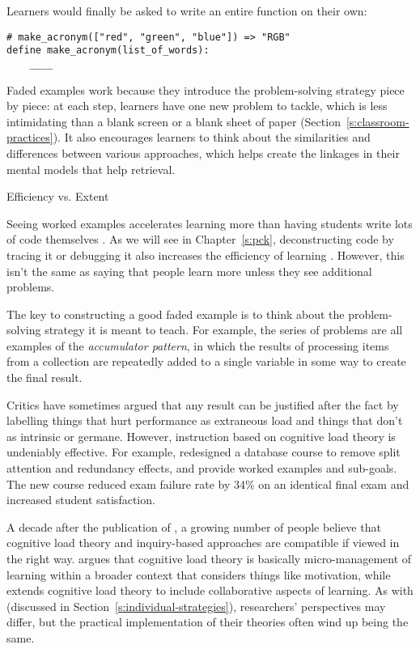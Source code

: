 Learners would finally be asked to write an entire function on their
own:

\begin{verbatim}
# make_acronym(["red", "green", "blue"]) => "RGB"
define make_acronym(list_of_words):
    ____
\end{verbatim}

Faded examples work because they introduce the problem-solving strategy
piece by piece: at each step, learners have one new problem to tackle,
which is less intimidating than a blank screen or a blank sheet of paper
(Section~\ref{s:classroom-practices}). It also encourages learners to
think about the similarities and differences between various approaches,
which helps create the linkages in their mental models that help
retrieval.

\begin{aside}{Efficiency vs. Extent}

Seeing worked examples accelerates learning more than having students
write lots of code themselves \cite{Skud2014}. As we will see in
Chapter~\ref{s:pck}, deconstructing code by tracing it or debugging it
also increases the efficiency of learning \cite{Grif2016}. However,
this isn't the same as saying that people learn more unless they see
additional problems.

\end{aside}

The key to constructing a good faded example is to think about the
problem-solving strategy it is meant to teach. For example, the series
of problems are all examples of the \emph{accumulator pattern}, in which the
results of processing items from a collection are repeatedly added to a
single variable in some way to create the final result.

Critics have sometimes argued that any result can be justified after the
fact by labelling things that hurt performance as extraneous load and
things that don't as intrinsic or germane. However, instruction based on
cognitive load theory is undeniably effective. For example,
\cite{Maso2016} redesigned a database course to remove split
attention and redundancy effects, and provide worked examples and
sub-goals. The new course reduced exam failure rate by 34\% on an
identical final exam and increased student satisfaction.

A decade after the publication of \cite{Kirs2006}, a growing number
of people believe that cognitive load theory and inquiry-based
approaches are compatible if viewed in the right way. \cite{Kaly2015}
argues that cognitive load theory is basically micro-management of
learning within a broader context that considers things like motivation,
while \cite{Kirs2018} extends cognitive load theory to include
collaborative aspects of learning. As with \cite{Mark2018} (discussed
in Section~\ref{s:individual-strategies}), researchers' perspectives may
differ, but the practical implementation of their theories often wind up
being the same.

